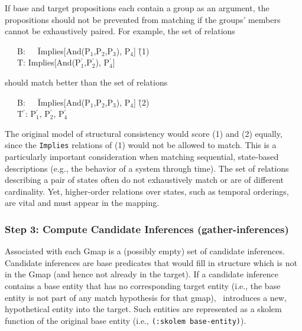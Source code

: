 If base and target propositions each contain a group as an argument, the
propositions should not be prevented from matching if the groups' members
cannot be exhaustively paired. For example, the set of relations
\begin{tt}
\begin{tabbing}
~~~B:~~~\= Implies[And(P$_{1}$,P$_{2}$,P$_{3}$), P$_{4}$] \` {\rm (1)} \\
~~~T:   \> Implies[And(P$^{\prime}_{1}$,P$^{\prime}_{2}$), P$^{\prime}_{4}$]
\end{tabbing}
\end{tt}

\noindent
should match better than the set of relations
\begin{tt}
\begin{tabbing}
~~~B:~~~\= Implies[And(P$_{1}$,P$_{2}$,P$_{3}$), P$_{4}$] \` {\rm (2)} \\
~~~T$^{\prime}$: \> P$^{\prime}_{1}$, P$^{\prime}_{2}$, P$^{\prime}_{4}$
\end{tabbing}
\end{tt}

\noindent 
The original model of structural consistency would score (1) and (2)
equally, since the {\tt Implies} relations of (1) would not be allowed to
match. This is a particularly important consideration when matching
sequential, state-based descriptions (e.g., the behavior of a system through
time). The set of relations describing a pair of states often do not
exhaustively match or are of different cardinality. Yet, higher-order
relations over states, such as temporal orderings, are vital and must appear
in the mapping.



\subsubsection{Step 3: Compute Candidate Inferences (gather-inferences)}

Associated with each Gmap is a (possibly empty) set of
candidate inferences.  Candidate inferences are base predicates that would
fill in structure which is not in the Gmap (and hence not already in the
target). If a candidate inference contains a base entity that has no
corresponding target entity (i.e., the base entity is not part of any match
hypothesis for that gmap), \SME\ introduces a new, hypothetical entity into
the target.  Such entities are represented as a skolem function of the
original base entity (i.e., {\tt (:skolem base-entity)}).

